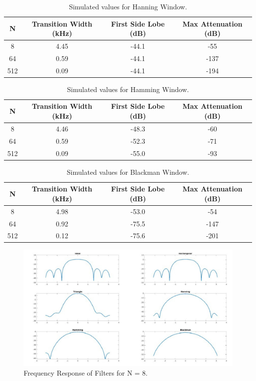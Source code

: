 \documentclass{article}
\begin{document}
\begin{table}
\centering
\caption{Simulated values for Hanning Window.}
\begin{tabular}{||c c c c||} 
 \hline
 N & Transition Width (kHz) & First Side Lobe (dB) & Max Attenuation (dB)\\ [0.5ex] 
 \hline\hline
 8 & 4.45 & -44.1 & -55 \\ 
 64 & 0.59 & -44.1 & -137 \\
 512 & 0.09 & -44.1 & -194 \\   
 \hline
\end{tabular}
\end{table}

\begin{table}
\centering
\caption{Simulated values for Hamming Window.}
\begin{tabular}{||c c c c||} 
 \hline
 N & Transition Width (kHz) & First Side Lobe (dB) & Max Attenuation (dB)\\ [0.5ex] 
 \hline\hline
 8 & 4.46 & -48.3 & -60 \\ 
 64 & 0.59 & -52.3 & -71 \\
 512 & 0.09 & -55.0 & -93 \\   
 \hline
\end{tabular}
\end{table}
\begin{table}
\centering
\caption{Simulated values for Blackman Window.}
\begin{tabular}{||c c c c||} 
 \hline
 N & Transition Width (kHz) & First Side Lobe (dB) & Max Attenuation (dB)\\ [0.5ex] 
 \hline\hline
 8 & 4.98 & -53.0 & -54 \\ 
 64 & 0.92 & -75.5 & -147 \\
 512 & 0.12 & -75.6 & -201 \\   
 \hline
\end{tabular}
\end{table}

\begin{figure}[H]
    \includegraphics[width=\textwidth]
    {N=8.jpg}
    \caption{Frequency Response of Filters for N = 8.}
    \end{figure}
\end{document}
